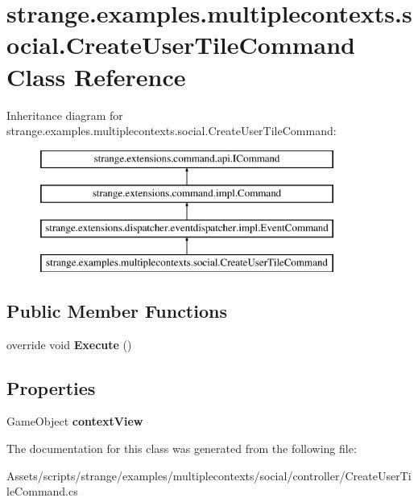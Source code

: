 \hypertarget{classstrange_1_1examples_1_1multiplecontexts_1_1social_1_1_create_user_tile_command}{\section{strange.\-examples.\-multiplecontexts.\-social.\-Create\-User\-Tile\-Command Class Reference}
\label{classstrange_1_1examples_1_1multiplecontexts_1_1social_1_1_create_user_tile_command}
}
Inheritance diagram for strange.\-examples.\-multiplecontexts.\-social.\-Create\-User\-Tile\-Command\-:\begin{figure}[H]
\begin{center}
\leavevmode
\includegraphics[height=4.000000cm]{classstrange_1_1examples_1_1multiplecontexts_1_1social_1_1_create_user_tile_command}
\end{center}
\end{figure}
\subsection*{Public Member Functions}
\begin{DoxyCompactItemize}
\item 
\hypertarget{classstrange_1_1examples_1_1multiplecontexts_1_1social_1_1_create_user_tile_command_ad47c4c736e1421e3e074b3074a8f72c9}{override void {\bfseries Execute} ()}\label{classstrange_1_1examples_1_1multiplecontexts_1_1social_1_1_create_user_tile_command_ad47c4c736e1421e3e074b3074a8f72c9}

\end{DoxyCompactItemize}
\subsection*{Properties}
\begin{DoxyCompactItemize}
\item 
\hypertarget{classstrange_1_1examples_1_1multiplecontexts_1_1social_1_1_create_user_tile_command_a5f7ba7db6b14824c724494e4c61ce1cb}{Game\-Object {\bfseries context\-View}}\label{classstrange_1_1examples_1_1multiplecontexts_1_1social_1_1_create_user_tile_command_a5f7ba7db6b14824c724494e4c61ce1cb}

\end{DoxyCompactItemize}


The documentation for this class was generated from the following file\-:\begin{DoxyCompactItemize}
\item 
Assets/scripts/strange/examples/multiplecontexts/social/controller/Create\-User\-Tile\-Command.\-cs\end{DoxyCompactItemize}
